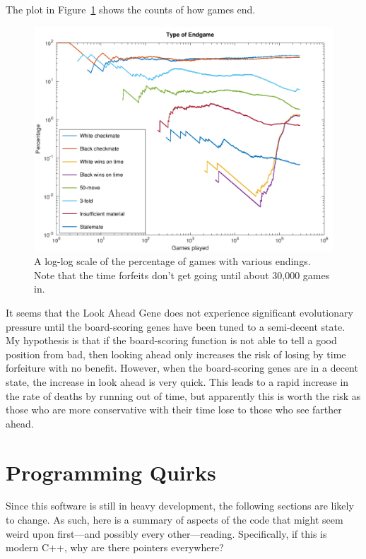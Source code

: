 \documentclass[letterpaper]{article}
\newcommand{\cpp}{C{\nobreak+}{\nobreak+}}
\renewcommand{\_}{\allowbreak\textunderscore\allowbreak}
\begin{document}
The plot in Figure~\ref{game-ending-plot} shows the counts of how games end.
\begin{figure}[htb]
	\centering
	\includegraphics[width=\textwidth]{game-endings-log-plot}
	\caption{A log-log scale of the percentage of games with various endings. Note that the time forfeits don't get going until about 30,000 games in.}\label{game-ending-plot}
\end{figure}
It seems that the Look Ahead Gene does not experience significant evolutionary pressure until the board-scoring genes have been tuned to a semi-decent state. My hypothesis is that if the board-scoring function is not able to tell a good position from bad, then looking ahead only increases the risk of losing by time forfeiture with no benefit. However, when the board-scoring genes are in a decent state, the increase in look ahead is very quick. This leads to a rapid increase in the rate of deaths by running out of time, but apparently this is worth the risk as those who are more conservative with their time lose to those who see farther ahead.

\section{Programming Quirks}

Since this software is still in heavy development, the following sections are likely to change. As such, here is a summary of aspects of the code that might seem weird upon first---and possibly every other---reading. Specifically, if this is modern \cpp{}, why are there pointers everywhere?
\end{document}
